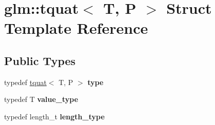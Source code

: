 \hypertarget{structglm_1_1tquat}{}\section{glm\+:\+:tquat$<$ T, P $>$ Struct Template Reference}
\label{structglm_1_1tquat}
\subsection*{Public Types}
\begin{DoxyCompactItemize}
\item 
\mbox{\label{structglm_1_1tquat_a5a7bf29e6af38b1b79e9f553fd85f3ec}} 
typedef \hyperlink{structglm_1_1tquat}{tquat}$<$ T, P $>$ {\bfseries type}
\item 
\mbox{\label{structglm_1_1tquat_ab335d431872cb11fb3b5e2476adc32d8}} 
typedef T {\bfseries value\+\_\+type}
\item 
\mbox{\label{structglm_1_1tquat_ab3ef67a20d129dcb01f042042218ba17}} 
typedef length\+\_\+t {\bfseries length\+\_\+type}
\end{DoxyCompactItemize}
